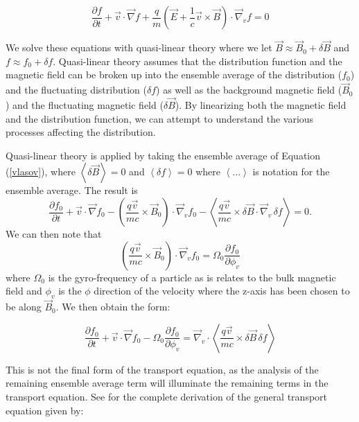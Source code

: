 \documentclass[%
 reprint,
 amsmath,amssymb,
 aps,
]{revtex4-1}
\begin{document}
\begin{equation}\label{vlasov}
\frac{\partial f}{\partial t}  + \vec{v} \cdot \vec{\nabla} f + \frac{q}{m} \left( \vec{E} + \frac{1}{c} \vec{v} \times \vec{B} \right) \cdot \vec{\nabla}_v f = 0
\end{equation}

We solve these equations with quasi-linear theory where we let $\vec{B} \approx \vec{B}_0 + \delta \vec{B}$ and $f \approx f_0 + \delta f$. Quasi-linear theory assumes that the distribution function and the magnetic field can be broken up into the ensemble average of the distribution ($f_0$) and the fluctuating distribution ($\delta f$) as well as the background magnetic field ($\vec{B}_0$) and the fluctuating magnetic field ($\delta \vec{B}$). By linearizing both the magnetic field and the distribution function, we can attempt to understand the various processes affecting the distribution.

Quasi-linear theory is applied by taking the ensemble average of Equation (\ref{vlasov}), where $\left \langle \delta \vec{B} \right \rangle = 0$ and $\left \langle\delta f \right \rangle = 0 $ where $\left \langle ... \right \rangle$ is notation for the ensemble average. The result is
\begin{equation}
\frac{\partial f_0}{\partial t} + \vec{v} \cdot \vec{\nabla} f_0 - \left( \frac{q \vec{v}}{m c} \times \vec{B} _0 \right) \cdot \vec{\nabla} _v f_0 - \left \langle \frac{q \vec{v}}{m c} \times \delta \vec{B} \cdot \vec{\nabla}_v \, \delta f \right \rangle = 0.
\end{equation}
We can then note that
\begin{equation}
\left( \frac{q \vec{v}}{m c} \times \vec{B} _0 \right) \cdot \vec{\nabla} _v f_0 = \Omega_0 \frac{\partial f_0}{\partial \phi _v}
\end{equation}
where $\Omega_0$ is the gyro-frequency of a particle as is relates to the bulk magnetic field and $\phi _v$ is the $\phi$ direction of the velocity where the z-axis has been chosen to be along $\vec{B} _0$. We then obtain the form:

\begin{equation}
\frac{\partial f_0}{\partial t} + \vec{v} \cdot \vec{\nabla} f_0 - \Omega_0 \frac{\partial f_0}{\partial \phi _v} = \vec{\nabla}_v \cdot \left \langle \frac{q \vec{v}}{m c} \times \delta \vec{B} \, \delta f \right \rangle
\end{equation}

This is not the final form of the transport equation, as the analysis of the remaining ensemble average term will illuminate the remaining terms in the transport equation. See \cite{jokipiiandparker} for the complete derivation of the general transport equation given by:
\end{document}
